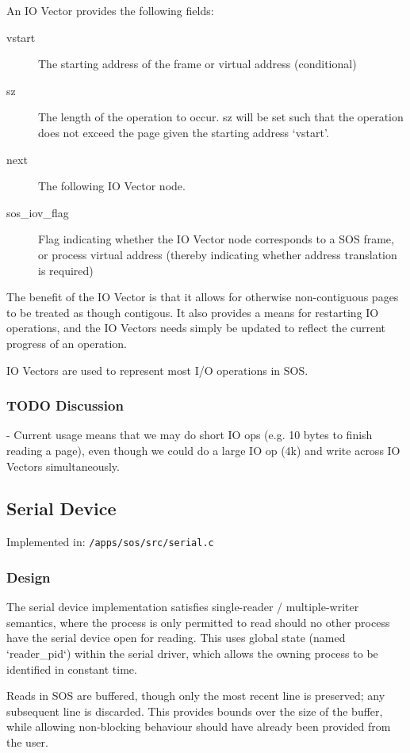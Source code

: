 \documentclass[a4paper,12pt]{article}
\begin{document}
An IO Vector provides the following fields:
\begin{description}
\item[vstart] The starting address of the frame or virtual address (conditional)
\item[sz] The length of the operation to occur.  sz will be set such that the
  operation does not exceed the page given the starting address `vstart'.
\item[next] The following IO Vector node.
\item[sos\_iov\_flag] Flag indicating whether the IO Vector node corresponds to
  a SOS frame, or process virtual address (thereby indicating whether
  address translation is required)
\end{description}

The benefit of the IO Vector is that it allows for otherwise non-contiguous
pages to be treated as though contigous.  It also provides a means for
restarting IO operations, and the IO Vectors needs simply be updated to
reflect the current progress of an operation.

IO Vectors are used to represent most I/O operations in SOS.

\subsubsection{TODO Discussion}
- Current usage means that we may do short IO ops (e.g. 10 bytes to finish
reading a page), even though we could do a large IO op (4k) and write across
IO Vectors simultaneously.

\subsection{Serial Device}
Implemented in: \texttt{/apps/sos/src/serial.c}

\subsubsection{Design}
The serial device implementation satisfies single-reader / multiple-writer
semantics, where the process is only permitted to read should no other process
have the serial device open for reading.  This uses global state (named
`reader\_pid`) within the serial driver, which allows the owning process to be
identified in constant time.

Reads in SOS are buffered, though only the most recent line is preserved; any
subsequent line is discarded.  This provides bounds over the size of the
buffer, while allowing non-blocking behaviour should have already been
provided from the user.
\end{document}
